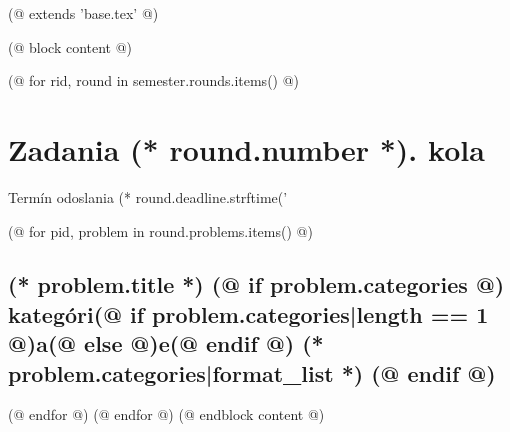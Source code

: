 (@ extends 'base.tex' @)

(@ block content @)
    \vspace*{15mm}
    
    \newpage
    

    (@ for rid, round in semester.rounds.items() @)%
        \newpage
        {
            \section{Zadania (* round.number *). kola}%
            \centering%
            \vspace*{-5mm}%
            Termín odoslania (* round.deadline.strftime('%
        }

        (@ for pid, problem in round.problems.items() @)%
        \setcounter{volume}{(* volume.number *)}%
        \setcounter{semester}{(* semester.number *)}%
        \setcounter{round}{(* round.number *)}%
        \setcounter{problem}{(* problem.number *)}%

        \subsection{%
            \texorpdfstring{%
                \large \textbf{(* problem.title *)}%
                (@ if problem.categories @)%
                \normalsize \hfill kategóri(@ if problem.categories|length == 1 @)a(@ else @)e(@ endif @) (* problem.categories|format_list *)%
                (@ endif @)
            }{%
                (* round.number *).(* problem.number *) (* problem.title *)%
            }%
        }%
        (@ endfor @)
    (@ endfor @)
(@ endblock content @)
